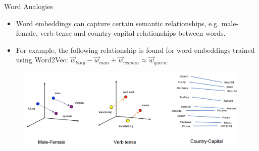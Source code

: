 \documentclass[handout]{beamer}
\begin{document}
\begin{frame}{Word Analogies}
\begin{scriptsize}
\begin{itemize}
   
\item Word embeddings can capture certain semantic relationships, e.g. male-female, verb tense and country-capital relationships between words.

\item For example, the following relationship is found for word embeddings
trained using Word2Vec: $\vec{w}_{king} - \vec{w}_{man} + \vec{w}_{woman} \approx \vec{w}_{queen}$.

    
\end{itemize}

 \begin{figure}[h]
    	\includegraphics[scale = 0.2]{pics/linear-relationships.png}
    \end{figure}

\end{scriptsize}
\end{frame}
\end{document}
